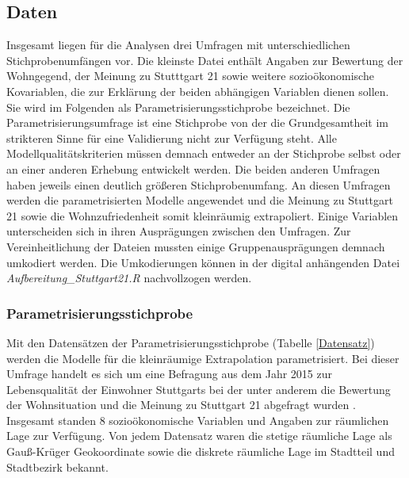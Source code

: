\documentclass{Vorlage}
\begin{document}
\subsection{Daten}
Insgesamt liegen für die Analysen drei Umfragen mit unterschiedlichen Stichprobenumfängen vor. Die kleinste Datei 
enthält Angaben zur Bewertung der Wohngegend, der Meinung zu Stutttgart 21 sowie weitere sozioökonomische Kovariablen, 
die zur Erklärung der beiden abhängigen Variablen dienen sollen. Sie wird im Folgenden als 
Parametrisierungsstichprobe bezeichnet. Die Parametrisierungsumfrage ist eine Stichprobe von 
der die Grundgesamtheit im strikteren Sinne für eine Validierung nicht zur Verfügung steht. Alle Modellqualitätskriterien müssen 
demnach entweder an der Stichprobe selbst oder an einer anderen Erhebung entwickelt werden. Die beiden anderen 
Umfragen haben jeweils einen deutlich größeren Stichprobenumfang. An diesen Umfragen werden die parametrisierten 
Modelle angewendet und die Meinung zu Stuttgart 21 sowie die Wohnzufriedenheit somit kleinräumig extrapoliert. Einige 
Variablen unterscheiden sich in ihren Ausprägungen zwischen den Umfragen. Zur Vereinheitlichung der Dateien mussten 
einige Gruppenausprägungen demnach umkodiert werden. Die Umkodierungen können in der digital anhängenden Datei 
\textit{Aufbereitung\_Stuttgart21.R} nachvollzogen werden.

\subsubsection{Parametrisierungsstichprobe}
Mit den Datensätzen der Parametrisierungsstichprobe (Tabelle \ref{Datensatz}) werden die Modelle für die kleinräumige 
Extrapolation parametrisiert. Bei dieser Umfrage handelt es sich um eine Befragung aus dem Jahr 2015 zur Lebensqualität 
der Einwohner Stuttgarts bei der unter anderem die Bewertung der Wohnsituation und die Meinung zu Stuttgart 21 abgefragt 
wurden \cite{Stuttgart2015}. Insgesamt standen 8 sozioökonomische Variablen und Angaben zur räumlichen Lage zur 
Verfügung. Von jedem Datensatz waren die stetige räumliche Lage als Gauß-Krüger Geokoordinate sowie die diskrete räumliche 
Lage im Stadtteil und Stadtbezirk bekannt.\\
\end{document}
